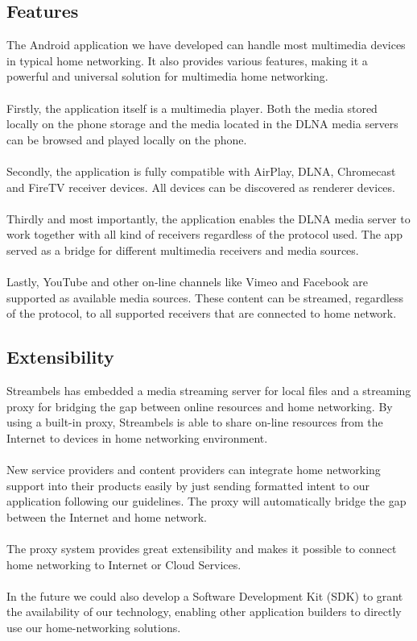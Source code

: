 \subsection{Features\label{3_4}}
The Android application we have developed can handle most multimedia devices in typical home networking. It also provides various features, making it a powerful and universal solution for multimedia home networking.\\
\\
Firstly, the application itself is a multimedia player. Both the media stored locally on the phone storage and the media located in the DLNA media servers can be browsed and played locally on the phone.\\
\\
Secondly, the application is fully compatible with AirPlay, DLNA, Chromecast and FireTV receiver devices. All devices can be discovered as renderer devices.\\
\\ 
Thirdly and most importantly, the application enables the DLNA media server to work together with all kind of receivers regardless of the protocol used. The app served as a bridge for different multimedia receivers and media sources.\\
\\
Lastly, YouTube and other on-line channels like Vimeo and Facebook are supported as available media sources. These content can be streamed, regardless of the protocol, to all supported receivers that are connected to home network.

\subsection{Extensibility\label{3_5}}
Streambels has embedded a media streaming server for local files and a streaming proxy for bridging the gap between online resources and home networking. By using a built-in proxy, Streambels is able to share on-line resources from the Internet to devices in home networking environment. \\
\\
New service providers and content providers can integrate home networking support into their products easily by just sending formatted intent to our application following our guidelines. The proxy will automatically bridge the gap between the Internet and home network.\\
\\
The proxy system provides great extensibility and makes it possible to connect home networking to Internet or Cloud Services.\\
\\
In the future we could also develop a Software Development Kit (SDK) to grant the availability of our technology, enabling other application builders to directly use our home-networking solutions.
